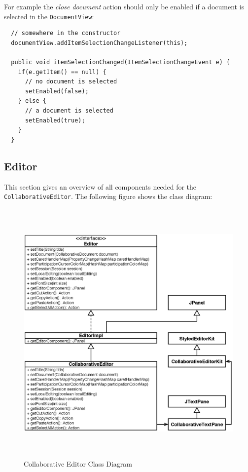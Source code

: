 For example the \emph{close document} action should only be enabled if a document is selected in the \texttt{Document\-View}:

\begin{verbatim}
  // somewhere in the constructor
  documentView.addItemSelectionChangeListener(this);

  public void itemSelectionChanged(ItemSelectionChangeEvent e) {
    if(e.getItem() == null) {
      // no document is selected
      setEnabled(false);
    } else {
      // a document is selected
      setEnabled(true);
    }
  }
\end{verbatim}

\newpage
\subsection{Editor}
This section gives an overview of all components needed for the \texttt{Collaborative\-Editor}. The following figure shows the class diagram:
\begin{figure}[H]
\begin{center}
  \includegraphics[height=5.25in, width=5.55in]{../images/finalreport/application_editor.eps}
\caption{Collaborative Editor Class Diagram}
\label{application_editor}
\end{center}
\end{figure}

